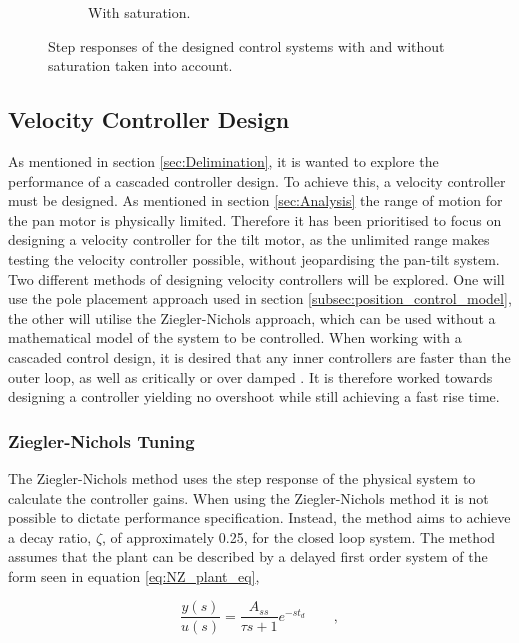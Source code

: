 \documentclass[../../main.tex]{subfiles}
\begin{document}
\begin{figure}[h]
\begin{subfigure}{0.48\textwidth}
    \caption{With saturation.}
    \label{fig:PosStepNoSat}
\end{subfigure}
\caption{Step responses of the designed control systems with and without saturation taken into account.}
\label{fig:PosStep}
\end{figure}


\subsection{Velocity Controller Design} \label{subsec:vel_controller_design}
As mentioned in section \ref{sec:Delimination}, it is wanted to explore the performance of a cascaded controller design. To achieve this, a velocity controller must be designed. As mentioned in section \ref{sec:Analysis} the range of motion for the pan motor is physically limited. Therefore it has been prioritised to focus on designing a velocity controller for the tilt motor, as the unlimited range makes testing the velocity controller possible, without jeopardising the pan-tilt system. Two different methods of designing velocity controllers will be explored. One will use the pole placement approach used in section \ref{subsec:position_control_model}, the other will utilise the Ziegler-Nichols approach, which can be used without a mathematical model of the system to be controlled.
When working with a cascaded control design, it is desired that any inner controllers are faster than the outer loop, as well as critically or over damped \cite{}. It is therefore worked towards designing a controller yielding no overshoot while still achieving a fast rise time.

\subsubsection*{Ziegler-Nichols Tuning}
The Ziegler-Nichols method uses the step response of the physical system to calculate the controller gains. When using the Ziegler-Nichols method it is not possible to dictate performance specification. Instead, the method aims to achieve a decay ratio, $\zeta$, of approximately 0.25, for the closed loop system. The method assumes that the plant can be described by a delayed first order system of the form seen in equation \ref{eq:NZ_plant_eq},

\begin{equation}
    \frac{y(s)}{u(s)} = \frac{A_{ss}}{\tau s + 1} e^{-s t_d} \qquad ,
    \label{eq:NZ_plant_eq}
\end{equation}
\end{document}
